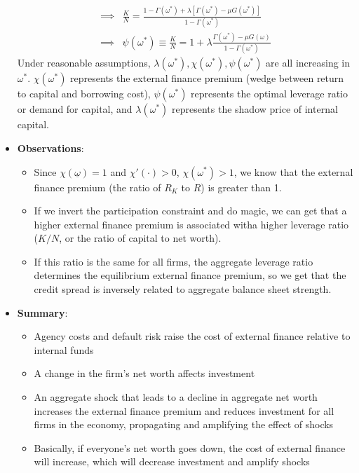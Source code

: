 \documentclass[12pt]{article}
\begin{document}
\begin{itemize}
\[\begin{split}
        \implies &\frac{K}{N} = \frac{1-\Gamma(\omega^*) + \lambda \left[\Gamma(\omega^*) - \mu G(\omega^*)\right]}{1-\Gamma(\omega^*)} \\
        \implies & \psi(\omega^*) \equiv \frac{K}{N} = 1 + \lambda \frac{\Gamma(\omega^*) - \mu G(\omega)}{1 - \Gamma(\omega^*)}
    \end{split}\]
    Under reasonable assumptions, $\lambda(\omega^*),\chi(\omega^*),\psi(\omega^*)$ are all increasing in $\omega^*$. $\chi(\omega^*)$ represents the external finance premium (wedge between return to capital and borrowing cost), $\psi(\omega^*)$ represents the optimal leverage ratio or demand for capital, and $\lambda(\omega^*)$ represents the shadow price of internal capital.
    \item \textbf{Observations}: 
    \begin{itemize}
        \item Since $\chi(\underline{\omega}) = 1$ and $\chi'(\cdot)>0$, $\chi(\omega^*) > 1$, we know that the external finance premium (the ratio of $R_K$ to $R$) is greater than 1. 
        \item If we invert the participation constraint and do magic, we can get that a higher external finance premium is associated witha  higher leverage ratio ($K/N$, or the ratio of capital to net worth). 
        \item If this ratio is the same for all firms, the aggregate leverage ratio determines the equilibrium external finance premium, so we get that the credit spread is inversely related to aggregate balance sheet strength.
    \end{itemize}
    \item \textbf{Summary}:
    \begin{itemize}
        \item Agency costs and default risk raise the cost of external finance relative to internal funds
        \item A change in the firm's net worth affects investment
        \item An aggregate shock that leads to a decline in aggregate net worth increases the external finance premium and reduces investment for all firms in the economy, propagating and amplifying the effect of shocks
        \item Basically, if everyone's net worth goes down, the cost of external finance will increase, which will decrease investment and amplify shocks
    \end{itemize}
\end{itemize}
\end{document}
